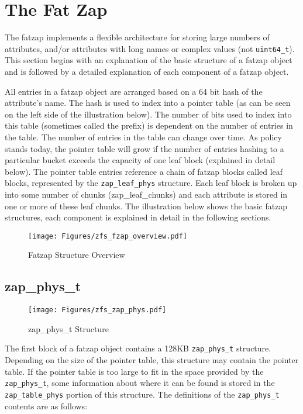 \section{The Fat Zap}

The fatzap implements a flexible architecture for storing large numbers of attributes,
and/or attributes with long names or complex values (not \lstinline{uint64_t}).
This section begins with an explanation of the basic structure of a fatzap object
and is followed by a detailed explanation of each component of a fatzap object.

All entries in a fatzap object are arranged based on a 64 bit hash of the attribute's name.
The hash is used to index into a pointer table
(as can be seen on the left side of the illustration below).
The number of bits used to index into this table
(sometimes called the prefix)
is dependent on the number of entries in the table.
The number of entries in the table can change over time.
As policy stands today,
the pointer table will grow if
the number of entries hashing to a particular bucket exceeds
the capacity of one leaf block
(explained in detail below).
The pointer table entries reference a chain of fatzap blocks
called leaf blocks,
represented by the \lstinline{zap_leaf_phys} structure.
Each leaf block is broken up into some number of chunks
(zap\_leaf\_chunks)
and each attribute is stored in one or more of these leaf chunks.
The illustration below shows the basic fatzap structures,
each component is explained in detail in the following sections.

\begin{figure}[ht]
  \centering
  \texttt{[image: Figures/zfs\_fzap\_overview.pdf]}
  \caption{Fatzap Structure Overview}
  \label{fig:fzap_overview}
\end{figure}

\subsection{zap\_phys\_t}

\begin{figure}[ht]
  \centering
  \texttt{[image: Figures/zfs\_zap\_phys.pdf]}
  \caption{zap\_phys\_t Structure}
  \label{fig:zap_phys_t}
\end{figure}

The first block of a fatzap object contains a 128KB \lstinline{zap_phys_t} structure.
Depending on the size of the pointer table,
this structure may contain the pointer table.
If the pointer table is too large to fit in the space provided by the \lstinline{zap_phys_t},
some information about where it can be found
is stored in the \lstinline{zap_table_phys} portion of this structure.
The definitions of the \lstinline{zap_phys_t} contents are as follows:

